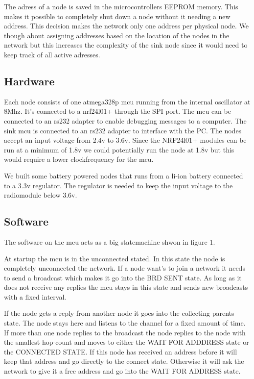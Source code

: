 \documentclass[a4paper,11pt]{article}
\begin{document}
The adress of a node is saved in the microcontrollers EEPROM memory.
This makes it possible to completely shut down a node without it 
needing a new address. This decision makes the network only one 
address per physical node. We though about assigning addresses based
on the location of the nodes in the network but this increases 
the complexity of the sink node since it would need to keep track of
all active adresses.

\subsection{Hardware}
Each node consists of one atmega328p mcu running from the
internal oscillator at 8Mhz. It's connected to a nrf24l01+ through the
SPI port. The mcu can be connected to an rs232 adapter to enable
debugging messages to a computer. The sink mcu is connected to an
rs232 adapter to interface with the PC. The nodes accept an input
voltage from 2.4v to 3.6v. Since the NRF24l01+ modules can be run at a
minimum of 1.8v we could potentially run the node at 1.8v but this
would require a lower clockfrequency for the mcu. 

We built some battery powered nodes that runs from a li-ion battery
connected to a 3.3v regulator. The regulator is needed to keep the 
input voltage to the radiomodule below 3.6v.



\subsection{Software}

The software on the mcu acts as a big statemachine shwon in figure 1.

At startup the mcu is in the unconnected stated. In this state the
node is completely unconnected the network. If a node want's to join a
network it needs to send a broadcast which makes it go into the BRD
SENT state. As long as it does not receive any replies the mcu stays
in this state and sends new broadcasts with a fixed interval.

If the node gets a reply from another node it goes into the collecting
parents state. The node stays here and listens to the channel for a
fixed amount of time. If more than one node replies to the broadcast
the node replies to the node with the smallest hop-count and moves to
either the WAIT FOR ADDDRESS state or the CONNECTED STATE. If this
node has received an address before it will keep that address and go
directly to the connect state. Otherwise it will ask the network to
give it a free address and go into the WAIT FOR ADDRESS state.
\end{document}
